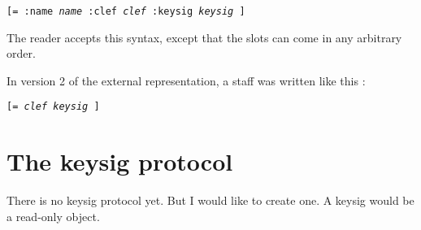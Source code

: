 \texttt{[= :name \textit{name} :clef \textit{clef} :keysig \textit{keysig} ]}

The reader accepts this syntax, except that the slots can come in any
arbitrary order. 

In version 2 of the external representation, a staff was written like
this :

\texttt{[= \textit{clef} \textit{keysig} ]}

\section{The keysig protocol}

There is no keysig protocol yet.  But I would like to create one.  A
keysig would be a read-only object.  

